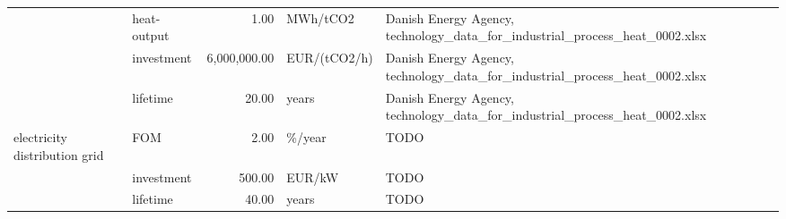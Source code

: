 \begin{longtable}{p{5cm}p{3cm}rp{3cm}p{11cm}}
                      & heat-output &           1.00 &                          MWh/tCO2 &                                                                                                                                                                                                                                                          Danish Energy Agency, technology\_data\_for\_industrial\_process\_heat\_0002.xlsx \\
                      & investment &   6,000,000.00 &                      EUR/(tCO2/h) &                                                                                                                                                                                                                                                          Danish Energy Agency, technology\_data\_for\_industrial\_process\_heat\_0002.xlsx \\
                      & lifetime &          20.00 &                             years &                                                                                                                                                                                                                                                          Danish Energy Agency, technology\_data\_for\_industrial\_process\_heat\_0002.xlsx \\
electricity distribution grid & FOM &           2.00 &                            \%/year &                                                                                                                                                                                                                                                                                                                                 TODO \\
                      & investment &         500.00 &                            EUR/kW &                                                                                                                                                                                                                                                                                                                                 TODO \\
                      & lifetime &          40.00 &                             years &                                                                                                                                                                                                                                                                                                                                 TODO \\

\end{longtable}
